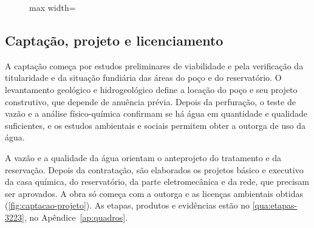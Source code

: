 \begin{figure}[H]
\begin{adjustbox}{max width=\linewidth}
  \end{adjustbox}
\end{figure}

\FloatBarrier
\subsection{Captação, projeto e licenciamento}
\label{subsec:captacao}

A captação começa por estudos preliminares de viabilidade e pela verificação da
titularidade e da situação fundiária das áreas do poço e do reservatório. O
levantamento geológico e hidrogeológico define a locação do poço e seu projeto
construtivo, que depende de anuência prévia. Depois da perfuração, o teste de
vazão e a análise físico-química confirmam se há água em quantidade e
qualidade suficientes, e os estudos ambientais e sociais permitem obter a
outorga de uso da água.

A vazão e a qualidade da água orientam o anteprojeto do tratamento e da
reservação. Depois da contratação, são elaborados os projetos básico e
executivo da casa química, do reservatório, da parte eletromecânica e da rede,
que precisam ser aprovados. A obra só começa com a outorga e as licenças
ambientais obtidas (\autoref{fig:captacao-projeto}). As etapas, produtos e
evidências estão no \autoref{qua:etapas-3223}, no Apêndice~\ref{ap:quadros}.

